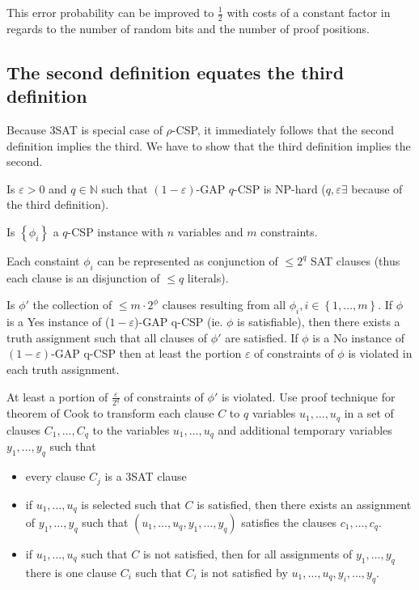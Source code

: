 \documentclass[a4paper]{article}
\newcommand{\cls}[1]{\rm{#1}}
\newcommand{\set}[1]{\left\{#1\right\}}
\begin{document}
This error probability can be improved to $\frac12$ with costs of a constant
factor in regards to the number of random bits and the number of proof
positions.

\subsection{The second definition equates the third definition}
%
Because 3SAT is special case of $\rho$-CSP, it immediately follows
that the second definition implies the third. We have to show that
the third definition implies the second.

Is $\varepsilon > 0$ and $q \in \mathbb{N}$ such that
$(1 - \varepsilon)$-GAP $q$-CSP is \cls{NP}-hard ($q, \varepsilon \exists$
because of the third definition).

Is $\set{\phi_i}$ a $q$-CSP instance with $n$ variables and $m$ constraints.

Each constaint $\phi_i$ can be represented as conjunction of $\leq 2^q$
SAT clauses (thus each clause is an disjunction of $\leq q$ literals).

Is $\phi'$ the collection of $\leq m \cdot 2^\phi$ clauses resulting from
all $\phi_i, i \in \set{1,\ldots,m}$. If $\phi$ is a Yes instance of
($1-\varepsilon$)-GAP q-CSP (ie. $\phi$ is satisfiable), then there exists
a truth assignment such that all clauses of $\phi'$ are satisfied.
If $\phi$ is a No instance of $(1-\varepsilon)$-GAP q-CSP then at least
the portion $\varepsilon$ of constraints of $\phi$ is violated in each
truth assignment.

At least a portion of $\frac{\varepsilon}{2^q}$ of constraints of $\phi'$
is violated. Use proof technique for theorem of Cook to transform each
clause $C$ to $q$ variables $u_1,\ldots,u_q$ in a set of clauses
$C_1,\ldots,C_q$ to the variables $u_1,\ldots,u_q$ and additional
temporary variables $y_1,\ldots,y_q$ such that
\begin{itemize}
  \item every clause $C_j$ is a 3SAT clause
  \item if $u_1,\ldots,u_q$ is selected such that $C$ is satisfied,
        then there exists an assignment of $y_1,\ldots,y_q$ such that
        $(u_1, \ldots, u_q, y_1, \ldots, y_q)$ satisfies the clauses
        $c_1,\ldots,c_q$.
  \item if $u_1,\ldots,u_q$ such that $C$ is not satisfied,
        then for all assignments of $y_1,\ldots,y_q$
        there is one clause $C_i$ such that $C_i$ is not satisfied
        by $u_1,\ldots,u_q,y_i,\ldots,y_q$.
\end{itemize}
\end{document}
